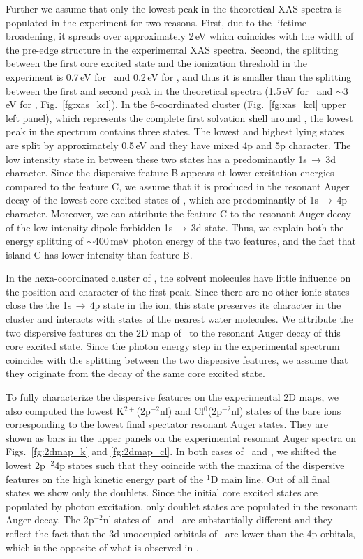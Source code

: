 Further we assume that only the lowest peak in the theoretical XAS spectra is populated in the experiment for two reasons. First, due to the lifetime broadening, it spreads over approximately 2\,eV which coincides with the width of the pre-edge structure in the experimental XAS spectra. Second, the splitting between the first core excited state and the ionization threshold in the experiment is 0.7\,eV for \ki~and 0.2\,eV for \cli, and thus it is smaller than the splitting between the first and second peak in the theoretical spectra (1.5\,eV for \ki~and $\sim$3\,eV for \cli, Fig.\ \ref{fg:xas_kcl}). In the 6-coordinated cluster (Fig.\ \ref{fg:xas_kcl} upper left panel), which represents the complete first solvation shell around \ki, the lowest peak in the spectrum contains three states. The lowest and highest lying states are split by approximately 0.5\,eV and they have mixed 4p and 5p character. The low intensity state in between these two states has a predominantly 1s$\,\rightarrow\,$3d character. Since the dispersive feature B appears at lower excitation energies compared to the feature C, we assume that it is produced in the resonant Auger decay of the lowest core excited states of \ki, which are predominantly of 1s$\,\rightarrow\,$4p character. Moreover, we can attribute the feature C to the resonant Auger decay of the low intensity dipole forbidden 1s$\,\rightarrow\,$3d state. Thus, we explain both the energy splitting of $\sim$400\,meV photon energy of the two features, and the fact that island C has lower intensity than feature B.


In the hexa-coordinated cluster of \cli, the solvent molecules have little influence on the position and character of the first peak. Since there are no other ionic states close the the 1s$\,\rightarrow\,$4p state in the ion, this state preserves its character in the cluster and interacts with states of the nearest water molecules. We attribute the two dispersive features on the 2D map of \cli~to the resonant Auger decay of this core excited state. {\color{red}Since the photon energy step in the experimental spectrum coincides with the splitting between the two dispersive features, we assume that they originate from the decay of the same core excited state.}


To fully characterize the dispersive features on the experimental 2D maps, we also computed the lowest K$^{2+}$(2p$^{-2}$nl) and Cl$^{0}$(2p$^{-2}$nl) states of the bare ions corresponding to the lowest final spectator resonant Auger states. They are shown as bars in the upper panels on the experimental resonant Auger spectra on Figs.\ \ref{fg:2dmap_k} and \ref{fg:2dmap_cl}. In both cases of \ki~and \cli, we shifted the lowest 2p$^{-2}$4p states such that they coincide with the maxima of the dispersive features on the high kinetic energy part of the $^1$D main line. Out of all final states we show only the doublets. Since the initial core excited states are populated by photon excitation, only doublet states are populated in the resonant Auger decay. The 2p$^{-2}$nl states of \ki~and \cli~are substantially different and they reflect the fact that the 3d unoccupied orbitals of \ki~are lower than the 4p orbitals, which is the opposite of what is observed in \cli. 


